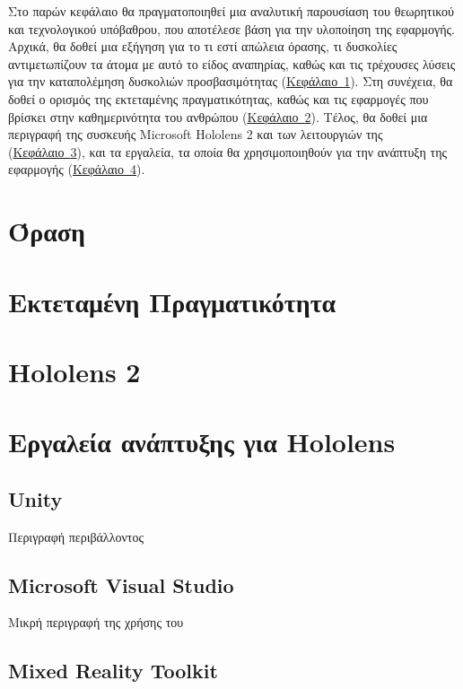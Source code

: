 
Στο παρών κεφάλαιο θα πραγματοποιηθεί μια αναλυτική παρουσίαση του θεωρητικού και τεχνολογικού υπόβαθρου, που αποτέλεσε βάση για την υλοποίηση της εφαρμογής. Αρχικά, θα δοθεί μια εξήγηση για το τι εστί απώλεια όρασης, τι δυσκολίες αντιμετωπίζουν τα άτομα με αυτό το είδος αναπηρίας, καθώς και τις τρέχουσες λύσεις για την καταπολέμηση δυσκολιών προσβασιμότητας (\hyperref[sec:visualImpairment]{Κεφάλαιο~\ref*{sec:visualImpairment}}). Στη συνέχεια, θα δοθεί ο ορισμός της εκτεταμένης πραγματικότητας, καθώς και τις εφαρμογές που βρίσκει στην καθημερινότητα του ανθρώπου (\hyperref[sec:extendedReality]{Κεφάλαιο~\ref*{sec:extendedReality}}). Τέλος, θα δοθεί μια περιγραφή της συσκευής Microsoft Hololens 2 και των λειτουργιών της (\hyperref[sec:hololensDesc]{Κεφάλαιο~\ref*{sec:hololensDesc}}), και τα εργαλεία, τα οποία θα χρησιμοποιηθούν για την ανάπτυξη της εφαρμογής (\hyperref[sec:hololensTools]{Κεφάλαιο~\ref*{sec:hololensTools}}).

\section{Όραση}\label{sec:visualImpairment}



\section{Εκτεταμένη Πραγματικότητα}\label{sec:extendedReality}



\section{Hololens 2}\label{sec:hololensDesc}




\section{Εργαλεία ανάπτυξης για Hololens}\label{sec:hololensTools}

\subsection{Unity}
Περιγραφή περιβάλλοντος

\subsection{Microsoft Visual Studio}
Μικρή περιγραφή της χρήσης του

\subsection{Mixed Reality Toolkit}

